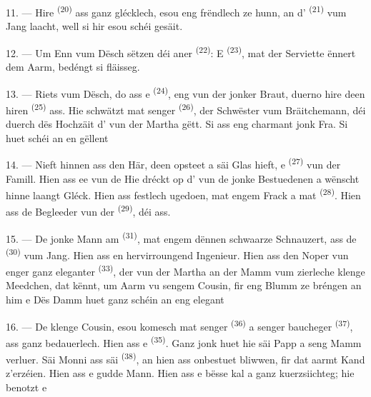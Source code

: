 11. --- Hire  \textsuperscript{(20)} ass ganz glécklech, esou eng
frëndlech  ze hunn, an d'
\textsuperscript{(21)} vum Jang laacht, well si hir  esou schéi
gesäit.

12. --- Um Enn vum Dësch sëtzen déi aner  \textsuperscript{(22)}:
 E 
\textsuperscript{(23)}, mat der Serviette ënnert dem Aarm, bedéngt si fläisseg.

\VUsaut{3.0mm}

13. --- Riets vum Dësch, do ass e  \textsuperscript{(24)}, eng
 vun der jonker Braut, duerno hire  deen hiren
 \textsuperscript{(25)} ass. Hie schwätzt mat senger
 \textsuperscript{(26)}, der Schwëster vum Bräitchemann, déi duerch
dës Hochzäit d' vun der Martha gëtt. Si ass eng charmant jonk
Fra. Si huet schéi  an en gëllent 

14. --- Nieft hinnen ass den Här, deen opsteet a säi Glas hieft, e 
\textsuperscript{(27)} vun der Famill. Hien ass ee vun de  Hie  dréckt op d' vun
de jonke Bestuedenen a wënscht hinne laangt Gléck. Hien ass festlech ugedoen, mat
engem Frack a mat  \textsuperscript{(28)}. Hien ass de Begleeder
vun der  \textsuperscript{(29)}, déi  ass.

15. --- De jonke Mann am  \textsuperscript{(31)}, mat engem dënnen
schwaarze Schnauzert, ass de  \textsuperscript{(30)} vum Jang. Hien
ass en hervirroungend Ingenieur. Hien ass den Noper vun enger ganz eleganter
 \textsuperscript{(33)}, der  vun der
Martha an der Mamm vum zierleche klenge Meedchen, dat kënnt, um Aarm vu sengem
Cousin, fir eng Blumm ze bréngen an him e  Dës Damm
huet ganz schéin  an eng elegant 

16. --- De klenge Cousin, esou komesch mat senger 
\textsuperscript{(36)} a senger baucheger  \textsuperscript{(37)},
ass ganz bedauerlech. Hien ass e  \textsuperscript{(35)}. Ganz jonk
huet hie säi Papp a seng Mamm verluer. Säi Monni ass säi 
\textsuperscript{(38)}, an hien ass onbestuet bliwwen, fir dat aarmt Kand
z'erzéien. Hien ass e gudde Mann. Hien ass e bësse kal a ganz kuerzsiichteg; hie
benotzt e 

